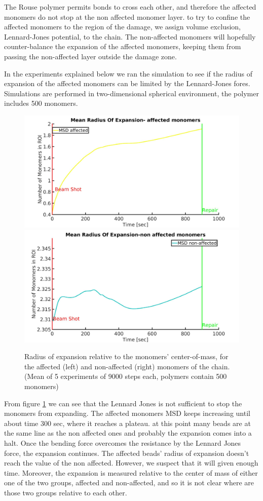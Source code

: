 \documentclass[12pt]{report}
\begin{document}
      The Rouse polymer permits bonds to cross each other, and therefore the affected monomers do not stop at the non affected monomer layer. 
      to try to confine the affected monomers to the region of the damage, we assign volume exclusion, Lennard-Jones potential, to the chain. The non-affected monomers will hopefully counter-balance the expansion of the affected monomers, keeping them from passing the non-affected layer outside the damage zone.
      
      In the experiments explained below we ran the simulation to see if the radius of expansion of the affected monomers can be limited by the Lennard-Jones fores. Simulations are performed in two-dimensional spherical environment, the polymer includes 500 monomers.
      
      
     \begin{figure}[H]
     \includegraphics[width=0.5\linewidth, height=0.3\textheight]{RadiusOfExpansion500BeadsLennardJones}
    	\includegraphics[width=0.5\linewidth, height=0.3\textheight]{RadiusOfExpansion500BeadsNonAffectedLennardJones}
        \caption{Radius of expansion relative to the monomers' center-of-mass, for the affected (left) and non-affected (right) monomers of the chain.(Mean of 5 experiments of 9000 steps each, polymers contain 500 monomers)}
        \label{fig:RadiusOfExpansion500BeadsLennardJones}
      \end{figure}
      
      From figure \ref{fig:RadiusOfExpansion500BeadsLennardJones} we can see that the Lennard Jones is not sufficient to stop the monomers from expanding. The affected monomers MSD keeps increasing until about time 300 sec, where it reaches a plateau. at this point many beads are at the same line as the non affected ones and probably the expansion comes into a halt. Once the bending force overcomes the resistance by the Lennard Jones force, the expansion continues. The affected beads' radius of expansion doesn't reach the value of the non affected. However, we suspect that it will given enough time. Moreover, the expansion is measured relative to the center of mass of either one of the two groups, affected and non-affected, and so it is not clear where are those two groups relative to each other. 
      
\end{document}

